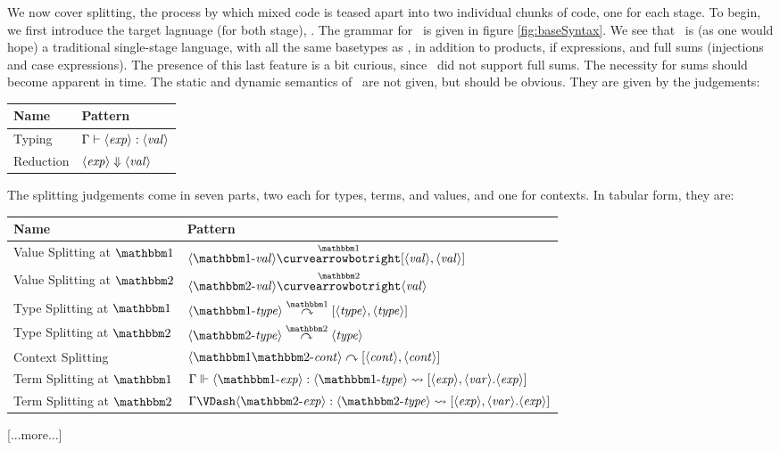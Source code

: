 \documentclass{article}
\begin{document}
We now cover splitting, the process by which mixed code is teased apart into two individual chunks of code, one for each stage.  To begin, we first introduce the target lagnuage (for both stage), \ellTarget.   The grammar for \ellTarget~is given in figure \ref{fig:baseSyntax}.  We see that \ellTarget~is (as one would hope) a traditional single-stage language, with all the same basetypes as \ellStaged, in addition to products, if expressions, and full sums (injections and case expressions).  The presence of this last feature is a bit curious, since \ellStaged~did not support full sums.  The necessity for sums should become apparent in time.  The static and dynamic semantics of \ellTarget~are not given, but should be obvious.  They are given by the judgements:

\begin{center}
\begin{tabular}{|l|l|} \hline
Name & Pattern \\ \hline
Typing & ${\Gamma} \vdash {\langle\mathit{exp}\rangle}:{\langle\mathit{val}\rangle}$ \\  \hline
Reduction & ${\langle\mathit{exp}\rangle} \Downarrow {\langle\mathit{val}\rangle}$ \\ \hline
\end{tabular}
\end{center}

The splitting judgements come in seven parts, two each for types, terms, and values, and one for contexts.  In tabular form, they are:
\begin{center}
\begin{tabular}{|l|l|} \hline
Name & Pattern \\ \hline
Value Splitting at $\bbone$& $\valo \vsplito [\val,\val]$ \\  \hline
Value Splitting at $\bbtwo$& $\valt \vsplits \val$ \\  \hline
Type Splitting at $\bbone$& $\typeo \tsplito [\type,\type]$ \\  \hline
Type Splitting at $\bbtwo$& $\typet \tsplits \type$ \\  \hline
Context Splitting & $\contextot \csplit [\context,\context]$ \\  \hline
Term Splitting at $\bbone$& $\splitone{\expro}{\typeo}{\expr,\var.\expr}$ \\  \hline
Term Splitting at $\bbtwo$& $\splittwo{\exprt}{\typet}{\expr,\var.\expr}$ \\  \hline
\end{tabular}
\end{center}

[...more...]
\end{document}
